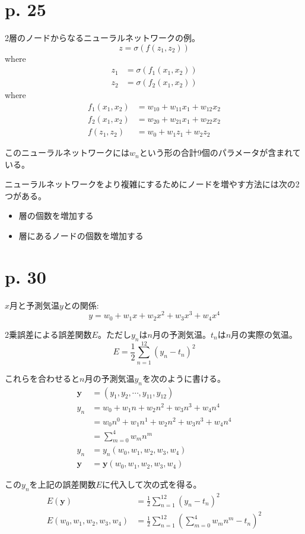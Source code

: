 \documentclass[uplatex,dvipdfmx]{jsarticle} \usepackage{amsmath,amssymb,bm}
\begin{document}
\section*{p. 25}
2層のノードからなるニューラルネットワークの例。
$$z=\sigma(f(z_1,z_2))$$
where
\begin{align*}
z_1 &= \sigma(f_1(x_1,x_2)) \\
z_2 &= \sigma(f_2(x_1,x_2))
\end{align*}
where
\begin{align*}
f_1(x_1,x_2) &= w_{10}+w_{11}x_1+w_{12}x_2 \\
f_2(x_1,x_2) &= w_{20}+w_{21}x_1+w_{22}x_2 \\
f(z_1,z_2) &= w_0+w_1z_1+w_2z_2
\end{align*}

このニューラルネットワークには$w_n$という形の合計9個のパラメータが含まれている。

ニューラルネットワークをより複雑にするためにノードを増やす方法には次の2つがある。
\begin{itemize}
\item 層の個数を増加する
\item 層にあるノードの個数を増加する
\end{itemize}



\section*{p. 30}
$x$月と予測気温$y$との関係:
$$y=w_0+w_1x+w_2x^2+w_3x^3+w_4x^4$$

2乗誤差による誤差関数$E$。ただし$y_n$は$n$月の予測気温。$t_n$は$n$月の実際の気温。
$$E=\frac12\sum_{n=1}^{12}(y_n-t_n)^2$$

これらを合わせると$n$月の予測気温$y_n$を次のように書ける。
\begin{align*}
\bm{y} &= (y_1, y_2, \cdots, y_{11}, y_{12}) \\
y_n &= w_0+w_1n+w_2n^2+w_3n^3+w_4n^4 \\
&= w_0n^0+w_1n^1+w_2n^2+w_3n^3+w_4n^4 \\
&= \sum_{m=0}^4w_mn^m \\
y_n &= y_n(w_0,w_1,w_2,w_3,w_4) \\
\bm{y} &= \bm{y}(w_0,w_1,w_2,w_3,w_4)
\end{align*}

この$y_n$を上記の誤差関数$E$に代入して次の式を得る。
\begin{align*}
E(\bm{y}) &= \frac12\sum_{n=1}^{12}(y_n-t_n)^2 \\
E(w_0,w_1,w_2,w_3,w_4) &= \frac12\sum_{n=1}^{12}
\left(
\sum_{m=0}^4w_mn^m-t_n
\right)^2
\end{align*}
\end{document}

